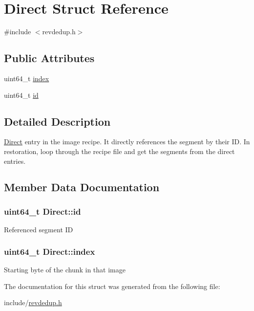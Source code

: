 \hypertarget{structDirect}{\section{\-Direct \-Struct \-Reference}
\label{structDirect}
}


{\ttfamily \#include $<$revdedup.\-h$>$}

\subsection*{\-Public \-Attributes}
\begin{DoxyCompactItemize}
\item 
uint64\-\_\-t \hyperlink{structDirect_a9ef6de54021820f3985e7f2eae3de38a}{index}
\item 
uint64\-\_\-t \hyperlink{structDirect_af87dc7a10a0d2e9c8e5d8ac250a95b33}{id}
\end{DoxyCompactItemize}


\subsection{\-Detailed \-Description}
\hyperlink{structDirect}{\-Direct} entry in the image recipe. \-It directly references the segment by their \-I\-D. \-In restoration, loop through the recipe file and get the segments from the direct entries. 

\subsection{\-Member \-Data \-Documentation}
\hypertarget{structDirect_af87dc7a10a0d2e9c8e5d8ac250a95b33}{
\subsubsection[{id}]{\setlength{\rightskip}{0pt plus 5cm}uint64\-\_\-t {\bf \-Direct\-::id}}}\label{structDirect_af87dc7a10a0d2e9c8e5d8ac250a95b33}
\-Referenced segment \-I\-D \hypertarget{structDirect_a9ef6de54021820f3985e7f2eae3de38a}{
\subsubsection[{index}]{\setlength{\rightskip}{0pt plus 5cm}uint64\-\_\-t {\bf \-Direct\-::index}}}\label{structDirect_a9ef6de54021820f3985e7f2eae3de38a}
\-Starting byte of the chunk in that image 

\-The documentation for this struct was generated from the following file\-:\begin{DoxyCompactItemize}
\item 
include/\hyperlink{revdedup_8h}{revdedup.\-h}\end{DoxyCompactItemize}

